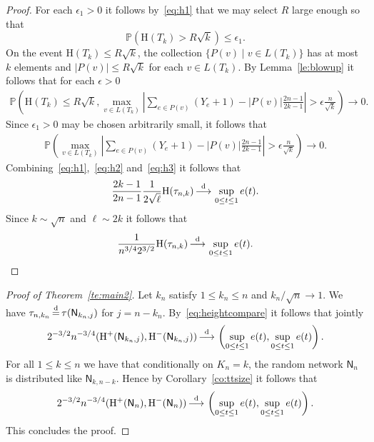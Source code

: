 \documentclass[english,11pt]{smfart}
\newcommand{\Prb}[1]{\mathbb{P}\left(#1\right)}
\newcommand{\convdis}{\,{\buildrel \mathrm{d} \over \longrightarrow}\,}
\newcommand{\eqdist}{\,{\buildrel \mathrm{d} \over =}\,}
\newcommand{\He}{\mathrm{H}}
\newcommand{\mN}{\mathsf{N}}
\numberwithin{equation}{section}
\begin{document}
\begin{proof}
	For each $\epsilon_1 > 0$ it follows by~\eqref{eq:h1} that we may select $R$ large enough so that \[
		\Prb{\He(T_k) > R \sqrt{k}} \le \epsilon_1.
	\]
	On the event $\He(T_k) \le R \sqrt{k}$, the collection $\{P(v) \mid v \in L(T_k)\}$ has at most $k$ elements and $|P(v)| \le R \sqrt{k}$ for each $v \in L(T_k)$.
	By Lemma~\ref{le:blowup} it follows that for each $\epsilon > 0$
	\begin{align*}
		\Prb{\He(T_k) \le R \sqrt{k}, \max_{v\in L(T_k)} \left|\sum_{e\in P(v)}(Y_e+1) - |P(v)|\frac{2n-1}{2k-1}\right| > \epsilon \frac{n}{\sqrt k}} \to 0.
	\end{align*}
	Since $\epsilon_1>0$ may be chosen arbitrarily small, it follows that
	\begin{align}
		\label{eq:h3}
		\Prb{\max_{v\in L(T_k)} \left|\sum_{e\in P(v)}(Y_e+1) - |P(v)|\frac{2n-1}{2k-1}\right| > \epsilon \frac{n}{\sqrt k}} \to 0.
	\end{align}
	Combining~\eqref{eq:h1},~\eqref{eq:h2} and~\eqref{eq:h3} it follows that
	\begin{align*}
		\frac{2k-1}{2n-1}\frac{1}{2 \sqrt{\ell}} \He(\tau_{n,k})  \convdis \sup_{0 \le t \le 1} e(t).
	\end{align*}
	Since $k \sim \sqrt{n}$ and $\ell \sim 2k$ it follows that
	\begin{align*}
		\frac{1 }{n^{3/4} 2^{3/2}} \He(\tau_{n,k})  \convdis \sup_{0 \le t \le 1} e(t).
	\end{align*}
\end{proof}

\begin{proof}[Proof of Theorem~\ref{te:main2}]
	Let $k_n$ satisfy $1 \le k_n \le n$ and $k_n/\sqrt{n} \to 1$. We have $\tau_{n,k_n} \eqdist \tau(\mN_{k_n,j})$ for $j = n - k_n$. By~\eqref{eq:heightcompare} it follows that jointly
	\begin{align*}
		2^{-3/2} n^{-3/4} (\He^+(\mN_{k_n,j}),\He^-(\mN_{k_n,j})) \convdis \left(\sup_{0 \le t \le 1} e(t), \sup_{0 \le t \le 1} e(t)\right).
	\end{align*}
	For all $1 \le k \le n$ we have that conditionally on $K_n=k$, the random network $\mN_n$ is distributed like $\mN_{k,n-k}$. Hence by Corollary~\ref{co:ttsize} it follows that
	\begin{align*}
		2^{-3/2} n^{-3/4} (\He^+(\mN_{n}),\He^-(\mN_{n})) \convdis \left(\sup_{0 \le t \le 1} e(t), \sup_{0 \le t \le 1} e(t)\right).
	\end{align*}
    This concludes the proof. 
\end{proof}
\end{document}
